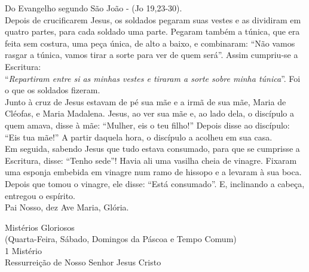 \begin{flushleft}
    Do Evangelho segundo São João - (\textcolor{VioletRed3}{Jo 19,23-30}). \\
    \hfill{} \break{}
    Depois de crucificarem Jesus, os soldados pegaram suas vestes e as dividiram em quatro partes, para cada soldado uma parte. Pegaram também a túnica, que era feita sem costura, uma peça única, de alto a baixo, e combinaram: ``Não vamos rasgar a túnica, vamos tirar a sorte para ver de quem será''. Assim cumpriu-se a Escritura:
    \vspace{.2cm} \\
    ``\textit{Repartiram entre si as minhas vestes e tiraram a sorte sobre minha túnica}''. Foi o que os soldados fizeram.
    \vspace{.2cm} \\
    Junto à cruz de Jesus estavam de pé sua mãe e a irmã de sua mãe, Maria de Cléofas, e Maria Madalena. Jesus, ao ver sua mãe e, ao lado dela, o discípulo a quem amava, disse à mãe: ``Mulher, eis o teu filho!'' Depois disse ao discípulo: ``Eis tua mãe!'' A partir daquela hora, o discípulo a acolheu em sua casa.
    \vspace{.2cm} \\
    Em seguida, sabendo Jesus que tudo estava consumado, para que se cumprisse a Escritura, disse: ``Tenho sede''! Havia ali uma vasilha cheia de vinagre. Fixaram uma esponja embebida em vinagre num ramo de hissopo e a levaram à sua boca. Depois que tomou o vinagre, ele disse: ``Está consumado''. E, inclinando a cabeça, entregou o espírito. \\
    \hfill{} \break{}
    Pai Nosso, dez Ave Maria, Glória.
\end{flushleft}
\newpage
\begin{center}
    Mistérios Gloriosos \\ \textcolor{VioletRed3}{\scriptsize{(Quarta-Feira, Sábado, Domingos da Páscoa e Tempo Comum)}} \\
    \hfill{} \break{}
    1\textordmasculine{} Mistério \\ Ressurreição de Nosso Senhor Jesus Cristo
\end{center}
